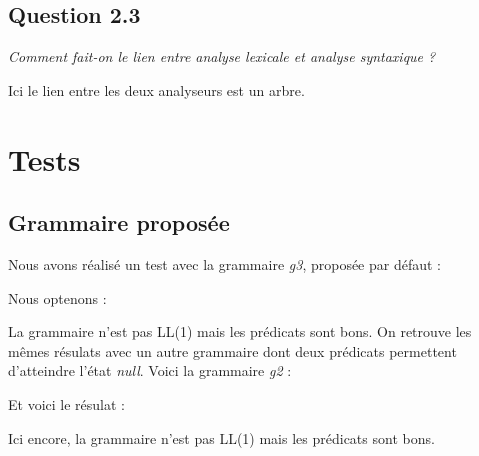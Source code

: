 \documentclass{rapport}
\begin{document}
  \section{Question 2.3}
  \textit{Comment fait-on le lien entre analyse lexicale et analyse syntaxique
  ?}

  Ici le lien entre les deux analyseurs est un arbre.

  \chapter{Tests}
  \label{chap:Tests}
  \section{Grammaire proposée}
  Nous avons réalisé un test avec la grammaire \emph{g3}, proposée par défaut :
  

  Nous optenons :
  


  La grammaire n'est pas LL(1) mais les prédicats sont bons. On retrouve les
  mêmes résulats avec un autre grammaire dont deux prédicats permettent
  d'atteindre l'état \emph{null}. Voici la grammaire \emph{g2} :
  

  Et voici le résulat :
  

  Ici encore, la grammaire n'est pas LL(1) mais les prédicats sont bons.
\end{document}
